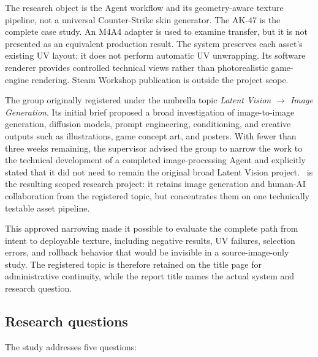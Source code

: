 The research object is the Agent workflow and its geometry-aware texture pipeline,
not a universal Counter-Strike skin generator. The AK-47 is the complete case
study. An M4A4 adapter is used to examine transfer, but it is not presented as an
equivalent production result. The system preserves each asset's existing UV
layout; it does not perform automatic UV unwrapping. Its software renderer provides
controlled technical views rather than photorealistic game-engine rendering.
Steam Workshop publication is outside the project scope.

The group originally registered under the umbrella topic
\emph{Latent Vision $\rightarrow$ Image Generation}. Its initial brief proposed a
broad investigation of image-to-image generation, diffusion models, prompt
engineering, conditioning, and creative outputs such as illustrations, game
concept art, and posters. With fewer than three weeks remaining, the supervisor
advised the group to narrow the work to the technical development of a completed
image-processing Agent and explicitly stated that it did not need to remain the
original broad Latent Vision project. \skinsmith\ is the resulting scoped research
project: it retains image generation and human-AI collaboration from the registered
topic, but concentrates them on one technically testable asset pipeline.

This approved narrowing made it possible to evaluate the complete path from intent
to deployable texture, including negative results, UV failures, selection errors,
and rollback behavior that would be invisible in a source-image-only study. The
registered topic is therefore retained on the title page for administrative
continuity, while the report title names the actual system and research question.

\subsection{Research questions}

The study addresses five questions:

